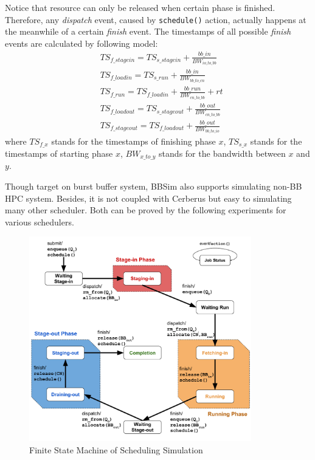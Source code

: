 Notice that resource can only be released when certain phase is finished.
Therefore, any \textit{dispatch} event, caused by \texttt{schedule()} action, actually happens
at the meanwhile of a certain \textit{finish} event.
The timestamps of all possible \textit{finish} events are calculated by following model:
\begin{align}
        & TS_{f\_stagein} = TS_{s\_stagein} + \frac{bb\_in}{BW_{io\_to\_bb}}\label{Equ:FinIn} \\
        & TS_{f\_loadin} = TS_{s\_run} + \frac{bb\_in}{BW_{bb\_to\_cn}}\label{Equ:FinMemIn} \\
        & TS_{f\_run} = TS_{f\_loadin} + \frac{bb\_run}{BW_{cn\_to\_bb}} + rt\label{Equ:FinRun} \\
        & TS_{f\_loadout} = TS_{s\_stageout} + \frac{bb\_out}{BW_{cn\_to\_bb}}\label{Equ:FinMemOut} \\
        & TS_{f\_stageout} = TS_{f\_loadout} + \frac{bb\_out}{BW_{bb\_to\_io}} \label{Equ:FinOut}
\end{align}
where $TS_{f\_x}$ stands for the timestamps of finishing phase $x$,
$TS_{s\_x}$ stands for the timestamps of starting phase $x$,
$BW_{x\_to\_y}$ stands for the bandwidth between $x$ and $y$.

Though target on burst buffer system, BBSim also supports simulating non-BB HPC system.
Besides, it is not coupled with Cerberus but easy to simulating many other scheduler.
Both can be proved by the following experiments for various schedulers.

\begin{figure}[!t]
\centering
        \includegraphics[width=3.8in]{3PhaseJobFSM}
        \caption{Finite State Machine of Scheduling Simulation}
\label{Fig:JobFSM}
\end{figure}

